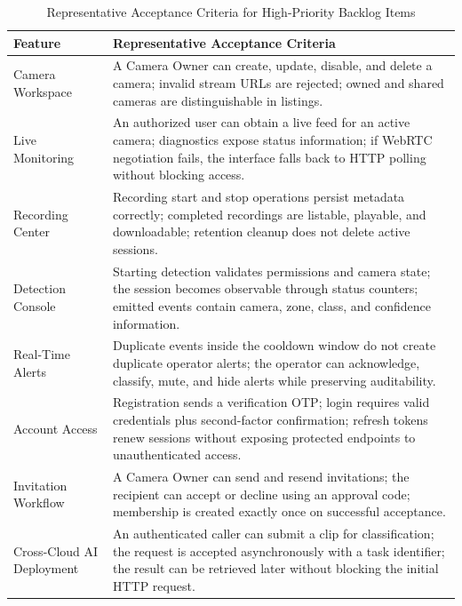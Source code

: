\documentclass[12pt,a4paper,oneside]{report}
\begin{document}
\begin{table}[!htbp]
\centering
\small
\begin{tabularx}{\textwidth}{|p{}|X|}
\hline
\textbf{Feature} & \textbf{Representative Acceptance Criteria} \\
\hline
Camera Workspace & A Camera Owner can create, update, disable, and delete a camera; invalid stream URLs are rejected; owned and shared cameras are distinguishable in listings. \\ \hline
Live Monitoring & An authorized user can obtain a live feed for an active camera; diagnostics expose status information; if WebRTC negotiation fails, the interface falls back to HTTP polling without blocking access. \\ \hline
Recording Center & Recording start and stop operations persist metadata correctly; completed recordings are listable, playable, and downloadable; retention cleanup does not delete active sessions. \\ \hline
Detection Console & Starting detection validates permissions and camera state; the session becomes observable through status counters; emitted events contain camera, zone, class, and confidence information. \\ \hline
Real-Time Alerts & Duplicate events inside the cooldown window do not create duplicate operator alerts; the operator can acknowledge, classify, mute, and hide alerts while preserving auditability. \\ \hline
Account Access & Registration sends a verification OTP; login requires valid credentials plus second-factor confirmation; refresh tokens renew sessions without exposing protected endpoints to unauthenticated access. \\ \hline
Invitation Workflow & A Camera Owner can send and resend invitations; the recipient can accept or decline using an approval code; membership is created exactly once on successful acceptance. \\ \hline
Cross-Cloud AI Deployment & An authenticated caller can submit a clip for classification; the request is accepted asynchronously with a task identifier; the result can be retrieved later without blocking the initial HTTP request. \\ \hline
\end{tabularx}
\caption{Representative Acceptance Criteria for High-Priority Backlog Items}
\label{tab:product_backlog_acceptance}
\end{table}

\end{document}
